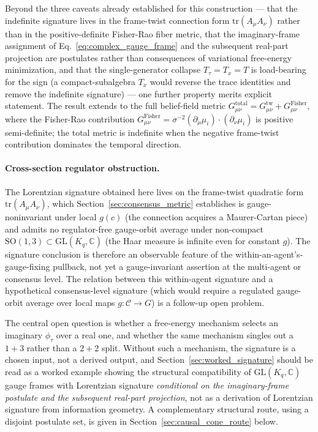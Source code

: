 \documentclass[11pt]{article}
\begin{document}
Beyond the three caveats already established for this construction — that the indefinite signature lives in the frame-twist connection form $\mathrm{tr}(A_\mu A_\nu)$ rather than in the positive-definite Fisher-Rao fiber metric, that the imaginary-frame assignment of Eq.~\eqref{eq:complex_gauge_frame} and the subsequent real-part projection are postulates rather than consequences of variational free-energy minimization, and that the single-generator collapse $T_\tau = T_x = T$ is load-bearing for the sign (a compact-subalgebra $T_x$ would reverse the trace identities and remove the indefinite signature) — one further property merits explicit statement. The result extends to the full belief-field metric $G_{\mu\nu}^{\mathrm{total}} = G_{\mu\nu}^{\mathrm{tw}} + G_{\mu\nu}^{\mathrm{Fisher}}$, where the Fisher-Rao contribution $G_{\mu\nu}^{\mathrm{Fisher}} = \sigma^{-2}(\partial_\mu \mu_i) \cdot (\partial_\nu \mu_i)$ is positive semi-definite; the total metric is indefinite when the negative frame-twist contribution dominates the temporal direction.

\paragraph{Cross-section regulator obstruction.}
The Lorentzian signature obtained here lives on the frame-twist quadratic form $\mathrm{tr}(A_\mu A_\nu)$, which Section~\ref{sec:consensus_metric} establishes is gauge-noninvariant under local $g(c)$ (the connection acquires a Maurer-Cartan piece) and admits no regulator-free gauge-orbit average under non-compact $\mathrm{SO}(1,3) \subset \mathrm{GL}(K_q, \mathbb{C})$ (the Haar measure is infinite even for constant $g$). The signature conclusion is therefore an observable feature of the within-an-agent's-gauge-fixing pullback, not yet a gauge-invariant assertion at the multi-agent or consensus level. The relation between this within-agent signature and a hypothetical consensus-level signature (which would require a regulated gauge-orbit average over local maps $g: \mathcal{C} \to G$) is a follow-up open problem.

The central open question is whether a free-energy mechanism selects an imaginary $\phi_\tau$ over a real one, and whether the same mechanism singles out a $1{+}3$ rather than a $2{+}2$ split. Without such a mechanism, the signature is a chosen input, not a derived output, and Section~\ref{sec:worked_signature} should be read as a worked example showing the structural compatibility of $\mathrm{GL}(K_q,\mathbb{C})$ gauge frames with Lorentzian signature \emph{conditional on the imaginary-frame postulate and the subsequent real-part projection}, not as a derivation of Lorentzian signature from information geometry. A complementary structural route, using a disjoint postulate set, is given in Section~\ref{sec:causal_cone_route} below.
\end{document}
